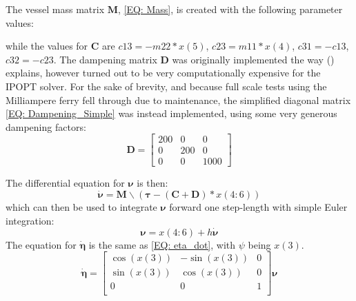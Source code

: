 The vessel mass matrix $\textbf{M}$, \eqref{EQ: Mass}, is created with the following parameter values:

while the values for $\textbf{C}$ are $c13 = -m22*x(5)$, $c23 = m11*x(4)$, $c31 = -c13$, $c32 = -c23$. The dampening matrix $\textbf{D}$ was originally
implemented the way (\cite{pedersen2019optimization}) explains, however turned out to be very computationally expensive for the \gls{IPOPT} solver.
For the sake of brevity, and because full scale tests using the Milliampere ferry fell through due to maintenance, the simplified diagonal matrix \eqref{EQ: Dampening_Simple}
was instead implemented, using some very generous dampening factors:
\begin{equation} \label{EQ: Dampening_method}
    \textbf{D} = \begin{bmatrix}
        200 & 0 & 0\\
        0 & 200 & 0\\
        0 & 0 & 1000
    \end{bmatrix}
\end{equation}

The differential equation for $\bm{\nu}$ is then:
\begin{equation}
    \dot{\bm{\nu}} = \textbf{M}\backslash(\bm{\tau} - (\textbf{C}+\textbf{D})*x(4:6))
\end{equation}
which can then be used to integrate $\bm{\nu}$ forward one step-length with simple Euler integration:
\begin{equation}
    \bm{\nu} = x(4:6) + h\dot{\bm{\nu}}
\end{equation}
The equation for $\dot{\bm{\eta}}$ is the same as \eqref{EQ: eta_dot}, with $\psi$ being $x(3)$.
\begin{equation}
    \dot{\bm{\eta}} = \begin{bmatrix}
        \cos(x(3)) & -\sin(x(3)) & 0\\
        \sin(x(3)) & \cos(x(3)) & 0\\
        0 & 0 & 1 \\
    \end{bmatrix} \bm{\nu}
\end{equation}

